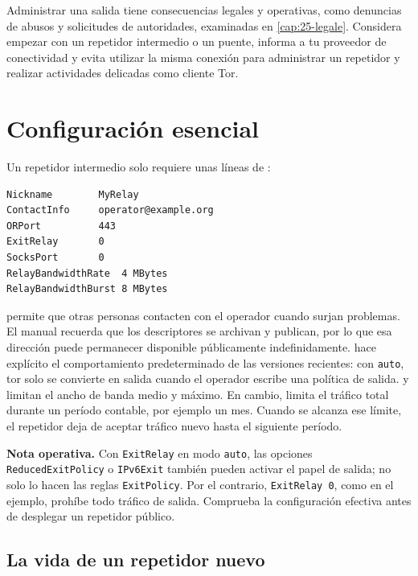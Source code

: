 \begin{attenzione}
Administrar una salida tiene consecuencias legales y operativas, como denuncias de abusos y solicitudes de autoridades, examinadas en \cref{cap:25-legale}. Considera empezar con un repetidor intermedio o un puente, informa a tu proveedor de conectividad y evita utilizar la misma conexión para administrar un repetidor y realizar actividades delicadas como cliente Tor.
\end{attenzione}

\section{Configuración esencial}\label{sec:relay-config}

Un repetidor intermedio solo requiere unas líneas de :
\begin{lstlisting}[numbers=none]
Nickname        MyRelay
ContactInfo     operator@example.org
ORPort          443
ExitRelay       0
SocksPort       0
RelayBandwidthRate  4 MBytes
RelayBandwidthBurst 8 MBytes
\end{lstlisting}

 permite que otras personas contacten con el operador cuando surjan problemas. El manual recuerda que los descriptores se archivan y publican, por lo que esa dirección puede permanecer disponible públicamente indefinidamente.  hace explícito el comportamiento predeterminado de las versiones recientes: con \texttt{auto}, tor solo se convierte en salida cuando el operador escribe una política de salida.  y  limitan el ancho de banda medio y máximo. En cambio,  limita el tráfico total durante un período contable, por ejemplo un mes. Cuando se alcanza ese límite, el repetidor deja de aceptar tráfico nuevo hasta el siguiente período.

\textbf{Nota operativa.} Con \texttt{ExitRelay} en modo \texttt{auto}, las opciones \texttt{ReducedExitPolicy} o \texttt{IPv6Exit} también pueden activar el papel de salida; no solo lo hacen las reglas \texttt{ExitPolicy}. Por el contrario, \texttt{ExitRelay 0}, como en el ejemplo, prohíbe todo tráfico de salida. Comprueba la configuración efectiva antes de desplegar un repetidor público.

\subsection{La vida de un repetidor nuevo}


